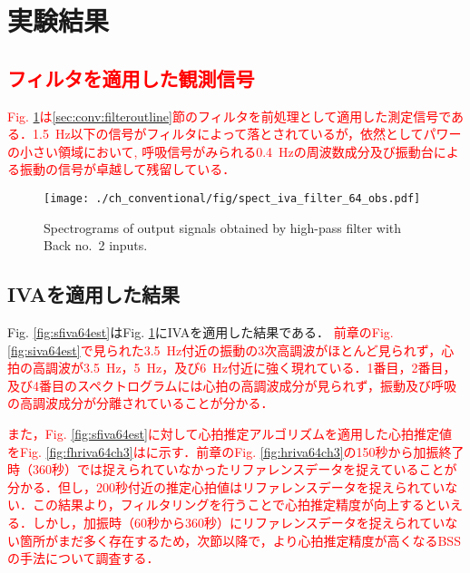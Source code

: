\section{実験結果}
\label{sec:conv:expresult5}

\subsection{\textcolor{red}{フィルタを適用した観測信号}}
\label{sec:conv:resultiva}
\textcolor{red}{Fig. \ref{fig:sfiva64obs}は\ref{sec:conv:filteroutline}節のフィルタを前処理として適用した測定信号である．1.5~Hz以下の信号がフィルタによって落とされているが，依然としてパワーの小さい領域において, 呼吸信号がみられる0.4~Hzの周波数成分及び振動台による振動の信号が卓越して残留している．}

\begin{figure}[tb]
\centering
\texttt{[image: ./ch\_conventional/fig/spect\_iva\_filter\_64\_obs.pdf]}
\caption{Spectrograms of output signals obtained by high-pass filter with Back no.~2 inputs.}
\label{fig:sfiva64obs}
\end{figure}

\subsection{IVAを適用した結果}
\label{sec:conv:resultiva}
Fig. \ref{fig:sfiva64est}はFig. \ref{fig:sfiva64obs}にIVAを適用した結果である．
\textcolor{red}{前章のFig. \ref{fig:siva64est}で見られた3.5~Hz付近の振動の3次高調波がほとんど見られず，心拍の高調波が3.5~Hz，5~Hz，及び6~Hz付近に強く現れている．1番目，2番目，及び4番目のスペクトログラムには心拍の高調波成分が見られず，振動及び呼吸の高調波成分が分離されていることが分かる．}

\textcolor{red}{また，Fig. \ref{fig:sfiva64est}に対して心拍推定アルゴリズムを適用した心拍推定値をFig. \ref{fig:fhriva64ch3}はに示す．前章のFig. \ref{fig:hriva64ch3}の150秒から加振終了時（360秒）では捉えられていなかったリファレンスデータを捉えていることが分かる．但し，200秒付近の推定心拍値はリファレンスデータを捉えられていない．この結果より，フィルタリングを行うことで心拍推定精度が向上するといえる．しかし，加振時（60秒から360秒）にリファレンスデータを捉えられていない箇所がまだ多く存在するため，次節以降で，より心拍推定精度が高くなるBSSの手法について調査する．}

